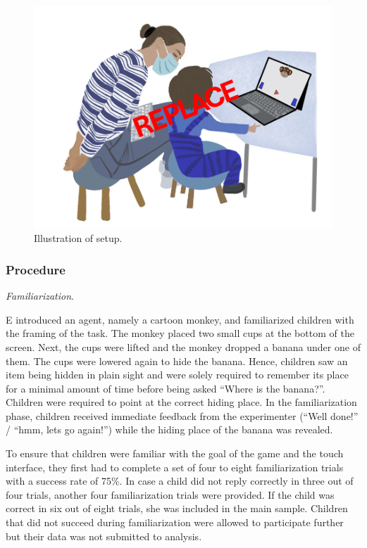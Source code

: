 \documentclass[
  man]{apa6}
\begin{document}
\begin{figure}

{\centering \includegraphics{../illustrations/Symlit_Rep_Setup} 

}

\caption{Illustration of setup.}\label{fig:figure-setup}
\end{figure}

\subsubsection{Procedure}\label{procedure}

\emph{Familiarization}.

E introduced an agent, namely a cartoon monkey, and familiarized children with the framing of the task. The monkey placed two small cups at the bottom of the screen. Next, the cups were lifted and the monkey dropped a banana under one of them. The cups were lowered again to hide the banana. Hence, children saw an item being hidden in plain sight and were solely required to remember its place for a minimal amount of time before being asked ``Where is the banana?''. Children were required to point at the correct hiding place. In the familiarization phase, children received immediate feedback from the experimenter (``Well done!'' / ``hmm, lets go again!'') while the hiding place of the banana was revealed.

To ensure that children were familiar with the goal of the game and the touch interface, they first had to complete a set of four to eight familiarization trials with a success rate of 75\%. In case a child did not reply correctly in three out of four trials, another four familiarization trials were provided. If the child was correct in six out of eight trials, she was included in the main sample. Children that did not succeed during familiarization were allowed to participate further but their data was not submitted to analysis.
\end{document}
